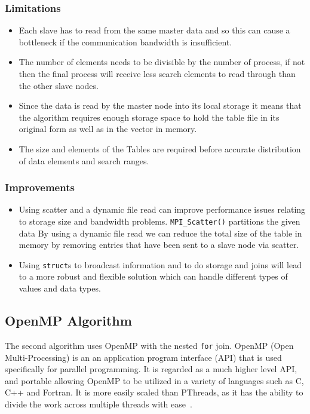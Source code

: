 \documentclass[10pt, conference]{IEEEtran}
\def\code#1{\texttt{#1}}
\begin{document}
\subsubsection{Limitations}
\label{sec: Limitations}
\begin{itemize}
\item Each slave has to read from the same master data and so this can cause a bottleneck if the communication bandwidth is insufficient. 
\item The number of elements needs to be divisible by the number of process, if not then the final process will receive less search elements to read through than the other slave nodes.
\item Since the data is read by the master node into its local storage it means that the algorithm requires enough storage space to hold the table file in its original form as well as in the vector in memory.
\item The size and elements of the Tables are required before accurate distribution of data elements and search ranges.
\end{itemize}

\subsubsection{Improvements}
\label{sec: Improvements}
\begin{itemize}
\item Using scatter and a dynamic file read can improve performance issues relating to storage size and bandwidth problems. \code{MPI\_Scatter()} partitions the given data  By using a dynamic file read we can reduce the total size of the table in memory by removing entries that have been sent to a slave node via scatter. 
\item Using \code{struct}s to broadcast information and to do storage and joins will lead to a more robust and flexible solution which can handle different types of values and data types.
\end{itemize}

\subsection{OpenMP Algorithm}
\label{sec: OpenMP Algorithm}
The second algorithm uses OpenMP with the nested \code{for} join. OpenMP (Open Multi-Processing) is an an application program interface (API) that is used specifically for parallel programming. It is regarded as a much higher level API, and portable allowing OpenMP to be utilized in a variety of languages such as C, C++ and Fortran. It is more easily scaled than PThreads, as it has the ability to divide the work across multiple threads with ease~\cite{OpenMP}.
\end{document}
